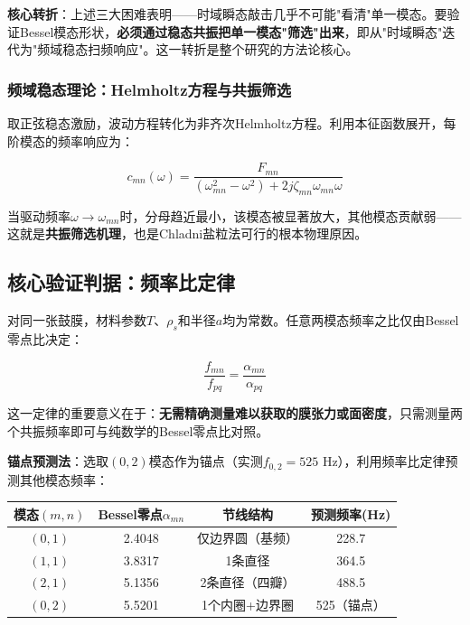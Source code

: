 \documentclass[12pt,a4paper]{ctexart}
\begin{document}
\begin{iterbox}[方法论迭代]
\textbf{核心转折}：上述三大困难表明——时域瞬态敲击几乎不可能"看清"单一模态。要验证Bessel模态形状，\textbf{必须通过稳态共振把单一模态"筛选"出来}，即从"时域瞬态"迭代为"频域稳态扫频响应"。这一转折是整个研究的方法论核心。
\end{iterbox}

\subsubsection{频域稳态理论：Helmholtz方程与共振筛选}

取正弦稳态激励，波动方程转化为非齐次Helmholtz方程。利用本征函数展开，每阶模态的频率响应为：

\[
c_{mn}(\omega) = \frac{F_{mn}}{(\omega_{mn}^2 - \omega^2) + 2j\zeta_{mn}\omega_{mn}\omega}
\]

当驱动频率$\omega \to \omega_{mn}$时，分母趋近最小，该模态被显著放大，其他模态贡献弱——这就是\textbf{共振筛选机理}，也是Chladni盐粒法可行的根本物理原因。

\subsection{核心验证判据：频率比定律}

对同一张鼓膜，材料参数$T$、$\rho_s$和半径$a$均为常数。任意两模态频率之比仅由Bessel零点比决定：

\[
\frac{f_{mn}}{f_{pq}} = \frac{\alpha_{mn}}{\alpha_{pq}}
\]

这一定律的重要意义在于：\textbf{无需精确测量难以获取的膜张力或面密度}，只需测量两个共振频率即可与纯数学的Bessel零点比对照。

\textbf{锚点预测法}：选取$(0,2)$模态作为锚点（实测$f_{0,2} = 525$ Hz），利用频率比定律预测其他模态频率：

\begin{center}
\begin{tabular}{cccc}
\toprule
\textbf{模态$(m,n)$} & \textbf{Bessel零点$\alpha_{mn}$} & \textbf{节线结构} & \textbf{预测频率(Hz)} \\
\midrule
$(0,1)$ & 2.4048 & 仅边界圆（基频） & 228.7 \\
$(1,1)$ & 3.8317 & 1条直径 & 364.5 \\
$(2,1)$ & 5.1356 & 2条直径（四瓣） & 488.5 \\
$(0,2)$ & 5.5201 & 1个内圈+边界圈 & 525（锚点） \\
\bottomrule
\end{tabular}
\end{center}
\end{document}
